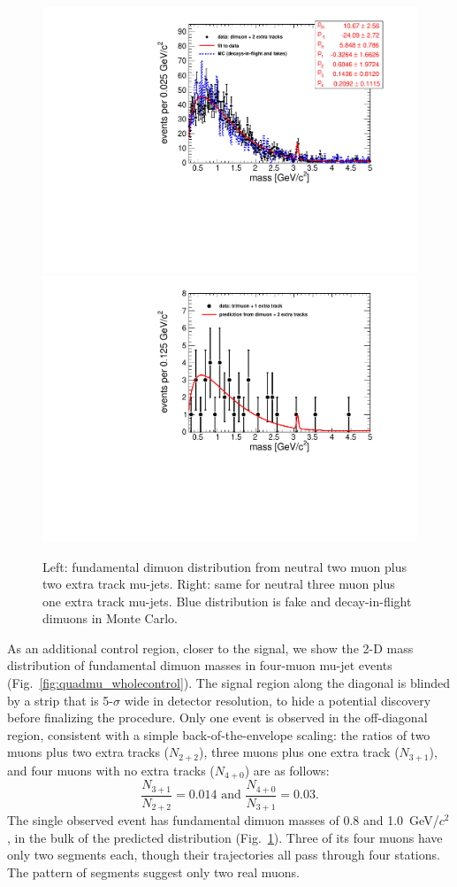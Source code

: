 \documentclass[12pt]{cms-tdr}
\begin{document}
\begin{figure}
\includegraphics[width=0.5\linewidth]{PLOTS/fullscale-backgroundEnriched_fakes.pdf}
\includegraphics[width=0.5\linewidth]{PLOTS/fullscale-control_fakes.pdf}

\caption{Left: fundamental dimuon distribution from neutral two muon
  plus two extra track mu-jets.  Right: same for neutral three muon plus
  one extra track mu-jets.  Blue distribution is fake and
  decay-in-flight dimuons in Monte Carlo. \label{fig:backgroundEnriched_fakes}}
\end{figure}

As an additional control region, closer to the signal, we show the 2-D
mass distribution of fundamental dimuon masses in four-muon mu-jet
events (Fig.~\ref{fig:quadmu_wholecontrol}).  The signal region along
the diagonal is blinded by a strip that is 5-$\sigma$ wide in detector
resolution, to hide a potential discovery before finalizing the
procedure.  Only one event is observed in the off-diagonal region,
consistent with a simple back-of-the-envelope scaling: the ratios of
two muons plus two extra tracks ($N_{2+2}$), three muons plus one
extra track ($N_{3+1}$), and four muons with no extra tracks
($N_{4+0}$) are as follows:
\begin{equation}
\frac{N_{3+1}}{N_{2+2}} = 0.014 \mbox{ and } \frac{N_{4+0}}{N_{3+1}} = 0.03.
\end{equation}
The single observed event has fundamental dimuon masses of 0.8 and
1.0~GeV/$c^2$, in the bulk of the predicted distribution
(Fig.~\ref{fig:backgroundEnriched_fakes}).  Three of its four muons
have only two segments each, though their trajectories all pass
through four stations.  The pattern of segments suggest only two real
muons.
\end{document}
